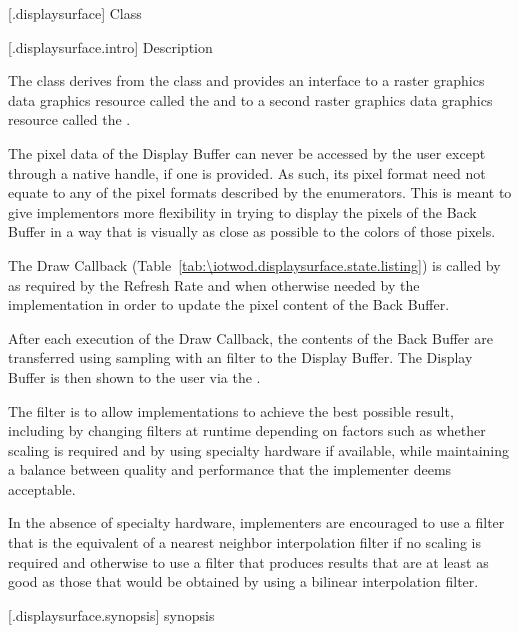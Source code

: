  [\iotwod.displaysurface] {Class }

 [\iotwod.displaysurface.intro] { Description}

\pnum
{}
The class  derives from the  class and provides an interface to a raster graphics data graphics resource called the  and to a second raster graphics data graphics resource called the .

\pnum
The pixel data of the Display Buffer can never be accessed by the user except through a native handle, if one is provided. As such, its pixel format need not equate to any of the pixel formats described by the  enumerators. This is meant to give implementors more flexibility in trying to display the pixels of the Back Buffer in a way that is visually as close as possible to the colors of those pixels.

\pnum
The Draw Callback (Table~\ref{tab:\iotwod.displaysurface.state.listing}) is called by  as required by the Refresh Rate and when otherwise needed by the implementation in order to update the pixel content of the Back Buffer.

\pnum
After each execution of the Draw Callback, the contents of the Back Buffer are transferred using sampling with an \unspecnorm filter to the Display Buffer. The Display Buffer is then shown to the user via the .
\begin{note}
The filter is \unspecnorm to allow implementations to achieve the best possible result, including by changing filters at runtime depending on factors such as whether scaling is required and by using specialty hardware if available, while maintaining a balance between quality and performance that the implementer deems acceptable.

In the absence of specialty hardware, implementers are encouraged to use a filter that is the equivalent of a nearest neighbor interpolation filter if no scaling is required and otherwise to use a filter that produces results that are at least as good as those that would be obtained by using a bilinear interpolation filter.
\end{note}

 [\iotwod.displaysurface.synopsis] { synopsis}

